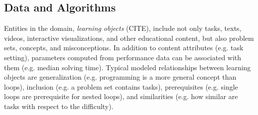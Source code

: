 

\subsection{Data and Algorithms}

Entities in the domain, \emph{learning objects} (CITE),
include not only tasks, texts, videos, interactive visualizations,
and other educational content,
but also problem sets, concepts, and misconceptions.
In addition to content attributes (e.g. task setting), parameters computed
from performance data can be associated with them (e.g. median solving time).
Typical modeled relationships between learning objects are
generalization (e.g. programming is a more general concept than loops),
inclusion (e.g. a problem set contains tasks),
prerequisites (e.g. single loops are prerequisite for nested loops),
and similarities (e.g. how similar are tasks with respect to the difficulty).


